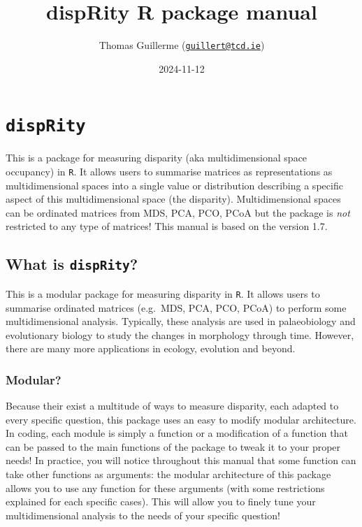 \documentclass[
]{book}
\title{dispRity R package manual}
\author{Thomas Guillerme (\href{mailto:guillert@tcd.ie}{\nolinkurl{guillert@tcd.ie}})}
\date{2024-11-12}
\begin{document}
\maketitle

{
\setcounter{tocdepth}{1}
\tableofcontents
}
\hypertarget{disprity}{%
\chapter{\texorpdfstring{\texttt{dispRity}}{dispRity}}\label{disprity}}

This is a package for measuring disparity (aka multidimensional space occupancy) in \texttt{R}.
It allows users to summarise matrices as representations as multidimensional spaces into a single value or distribution describing a specific aspect of this multidimensional space (the disparity).
Multidimensional spaces can be ordinated matrices from MDS, PCA, PCO, PCoA but the package is \emph{not} restricted to any type of matrices!
This manual is based on the version 1.7.

\hypertarget{what-is-disprity}{%
\section{\texorpdfstring{What is \texttt{dispRity}?}{What is dispRity?}}\label{what-is-disprity}}

This is a modular package for measuring disparity in \texttt{R}.
It allows users to summarise ordinated matrices (e.g.~MDS, PCA, PCO, PCoA) to perform some multidimensional analysis.
Typically, these analysis are used in palaeobiology and evolutionary biology to study the changes in morphology through time.
However, there are many more applications in ecology, evolution and beyond.

\hypertarget{modular}{%
\subsection{Modular?}\label{modular}}

Because their exist a multitude of ways to measure disparity, each adapted to every specific question, this package uses an easy to modify modular architecture.
In coding, each module is simply a function or a modification of a function that can be passed to the main functions of the package to tweak it to your proper needs!
In practice, you will notice throughout this manual that some function can take other functions as arguments: the modular architecture of this package allows you to use any function for these arguments (with some restrictions explained for each specific cases).
This will allow you to finely tune your multidimensional analysis to the needs of your specific question!
\end{document}
